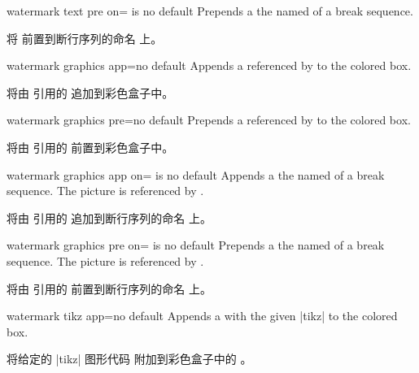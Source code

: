 \begin{docTcbKey}{watermark text pre on}{= is }{no default}
Prepends a  the named  of a break sequence.

将  前置到断行序列的命名  上。
\end{docTcbKey}

\begin{docTcbKey}{watermark graphics app}{=}{no default}
Appends a  referenced by  to the colored box.

将由  引用的  追加到彩色盒子中。
\end{docTcbKey}

\begin{docTcbKey}{watermark graphics pre}{=}{no default}
Prepends a  referenced by  to the colored box.

将由  引用的  前置到彩色盒子中。
\end{docTcbKey}

\begin{docTcbKey}{watermark graphics app on}{= is }{no default}
Appends a  the named  of a break sequence.
The picture is referenced by .

将由  引用的  追加到断行序列的命名  上。
\end{docTcbKey}


\begin{docTcbKey}{watermark graphics pre on}{= is }{no default}
Prepends a  the named  of a break sequence.
The picture is referenced by .

将由  引用的  前置到断行序列的命名  上。
\end{docTcbKey}


\begin{docTcbKey}{watermark tikz app}{=}{no default}
Appends a  with the  given |tikz|  to the colored box.

将给定的 |tikz| 图形代码  附加到彩色盒子中的 。
\end{docTcbKey}

